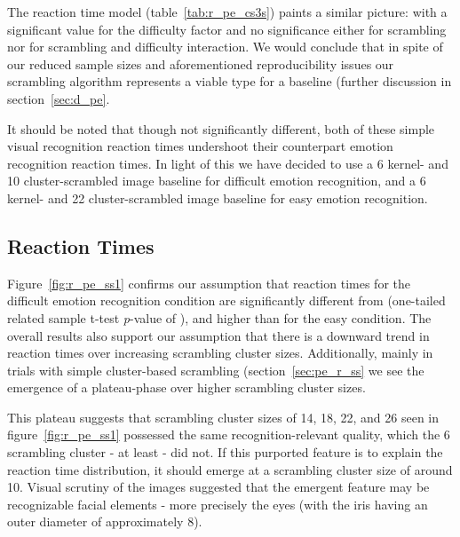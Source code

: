 	    The reaction time model (table~\ref{tab:r_pe_cs3s}) paints a similar picture: with a significant value for the difficulty factor and no significance either for scrambling nor for scrambling and difficulty interaction.
	    We would conclude that in spite of our reduced sample sizes and aforementioned reproducibility issues our scrambling algorithm represents a viable type for a baseline (further discussion in section~\ref{sec:d_pe}.
	    
	    It should be noted that though not significantly different, both of these simple visual recognition reaction times undershoot their counterpart emotion recognition reaction times.
	    In light of this we have decided to use a \SI{6}{\pixel} kernel- and \SI{10}{\pixel} cluster-scrambled image baseline for difficult emotion recognition, 
	    and a \SI{6}{\pixel} kernel- and \SI{22}{\pixel} cluster-scrambled image baseline for easy emotion recognition.
	\subsection{Reaction Times}\label{sec:pe_d_rt}
	    Figure~\ref{fig:r_pe_ss1} confirms our assumption that reaction times for the difficult emotion recognition condition are significantly different from (one-tailed related sample t-test \textit{p}-value of 
	    ),
	    and higher than for the easy condition.
	    The overall results also support our assumption that there is a downward trend in reaction times over increasing scrambling cluster sizes.
	    Additionally, mainly in trials with simple cluster-based scrambling (section~\ref{sec:pe_r_ss} we see the emergence of a plateau-phase over higher scrambling cluster sizes.
	    
	    This plateau suggests that scrambling cluster sizes of \SI{14}{\pixel}, \SI{18}{\pixel}, \SI{22}{\pixel}, and \SI{26}{\pixel} seen in figure~\ref{fig:r_pe_ss1} possessed the same recognition-relevant quality, which the \SI{6}{\pixel} scrambling cluster - at least - did not.
	    If this purported feature is to explain the reaction time distribution, it should emerge at a scrambling cluster size of around \SI{10}{\pixel}.
	    Visual scrutiny of the images suggested that the emergent feature may be recognizable facial elements - more precisely the eyes (with the iris having an outer diameter of approximately \SI{8}{\pixel}).
	    
